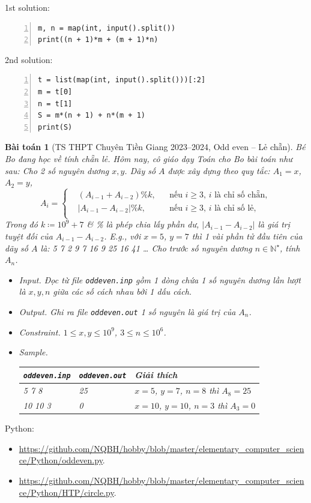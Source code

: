 \documentclass{article}
\newtheorem{baitoan}{Bài toán}
\begin{document}
\begin{multicols}{2}
1st solution:
\begin{Verbatim}[numbers=left,xleftmargin=5mm]
m, n = map(int, input().split())
print((n + 1)*m + (m + 1)*n)
\end{Verbatim}
\columnbreak
2nd solution:
\begin{Verbatim}[numbers=left,xleftmargin=5mm]
t = list(map(int, input().split()))[:2]
m = t[0]
n = t[1]
S = m*(n + 1) + n*(m + 1)
print(S)
\end{Verbatim}
\end{multicols}

\begin{baitoan}[TS THPT Chuyên Tiền Giang 2023--2024, Odd even -- Lẻ chẵn]
	Bé Bo đang học về tính chẵn lẻ. Hôm nay, cô giáo dạy Toán cho Bo bài toán như sau: Cho 2 số nguyên dương $x,y$. Dãy số $A$ được xây dựng theo quy tắc: $A_1 = x$, $A_2 = y$,
	\begin{equation*}
		A_i = \left\{\begin{split}
			&(A_{i-1} + A_{i-2})\%k,&&\mbox{nếu } i\ge3,\,i\mbox{ là chỉ số chẵn},\\
			&|A_{i-1} - A_{i-2}|\%k,&&\mbox{nếu } i\ge3,\,i\mbox{ là chỉ số lẻ},\\
		\end{split}\right.
	\end{equation*}
	Trong đó $k\coloneqq10^9 + 7$ \& \% là phép chia lấy phần dư, $|A_{i-1} - A_{i-2}|$ là giá trị tuyệt đối của $A_{i-1} - A_{i-2}$. E.g., với $x = 5$, $y = 7$ thì 1 vài phần tử đầu tiên của dãy số $A$ là: \emph{5 7 2 9 7 16 9 25 16 41 \ldots} Cho trước số nguyên dương $n\in\mathbb{N}^\star$, tính $A_n$.
	\begin{itemize}
		\item {\sf Input.} Đọc từ file \verb|oddeven.inp| gồm 1 dòng chứa 1 số nguyên dương lần lượt là $x,y,n$ giữa các số cách nhau bởi 1 dấu cách.
		\item {\sf Output.} Ghi ra file \verb|oddeven.out| 1 số nguyên là giá trị của $A_n$.
		\item {\sf Constraint.} $1\le x,y\le10^9$, $3\le n\le10^6$.
		\item {\sf Sample.}
		\begin{table}[H]
			\centering
			\begin{tabular}{|l|l|l|}
				\hline
				{\tt oddeven.inp} & {\tt oddeven.out} & Giải thích \\
				\hline
				5 7 8 & 25 & $x = 5$, $y = 7$, $n = 8$ thì $A_8 = 25$ \\
				\hline
				10 10 3 & 0 & $x = 10$, $y = 10$, $n = 3$ thì $A_3 = 0$ \\
				\hline
			\end{tabular}
		\end{table}
	\end{itemize}
\end{baitoan}
Python:
\begin{itemize}
	\item \url{https://github.com/NQBH/hobby/blob/master/elementary_computer_science/Python/oddeven.py}.
	\item \url{https://github.com/NQBH/hobby/blob/master/elementary_computer_science/Python/HTP/circle.py}.
\end{itemize}
\end{document}
